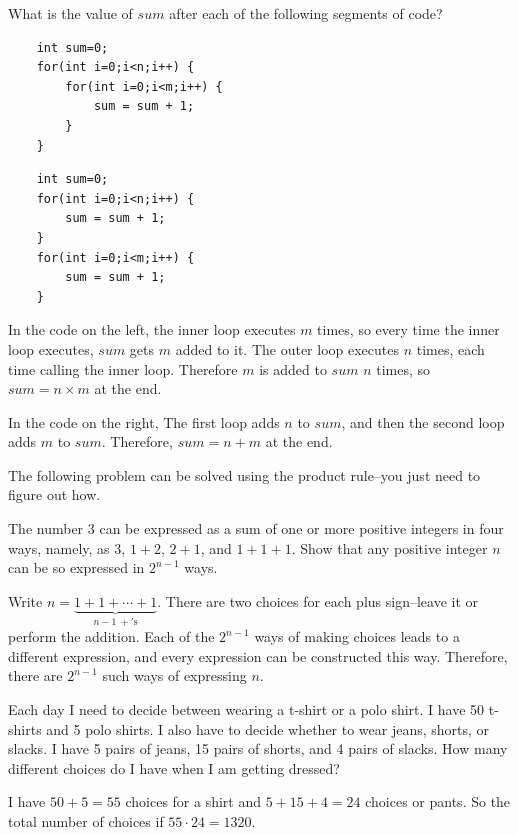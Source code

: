 \begin{exa}
What is the value of $sum$ after each of the following segments of code?

\noindent
\begin{minipage}[t]{.45\textwidth}
{\small 
\begin{verbatim}
    int sum=0;
    for(int i=0;i<n;i++) {
        for(int i=0;i<m;i++) {
            sum = sum + 1;
        }
    }
\end{verbatim}
}
\end{minipage}
\hfill
\begin{minipage}[t]{.45\textwidth}
{\small 
\begin{verbatim}
    int sum=0;
    for(int i=0;i<n;i++) {
        sum = sum + 1;
    }
    for(int i=0;i<m;i++) {
        sum = sum + 1;
    }
\end{verbatim}
}
\end{minipage}
\begin{sol}
In the code on the left, the inner loop executes $m$ times, so every time
the inner loop executes, $sum$ gets $m$ added to it.  The outer loop executes $n$
times, each time calling the inner loop.  Therefore $m$ is added to $sum$ $n$ times,
so $sum=n\times m$ at the end.

In the code on the right,  The first loop adds $n$ to $sum$, and then the second loop
adds $m$ to $sum$.  Therefore, $sum=n+m$ at the end.
\end{sol}
\end{exa}

The following problem can be solved using the product rule--you just need to figure out how.

\begin{exer}
The number $3$ can be expressed as a sum of one or more positive
integers in four ways, namely, as $3$, $1+2$, $2+1$, and $1+1+1$.
Show that any positive integer $n$ can be so expressed in $2^{n-1}$
ways.

\noindent
\answerlinethree
\begin{answer} 
Write $n = \underbrace{1 + 1 + \cdots + 1}_{n-1 \ +\mathrm{'s}}$.
There are two choices for each plus sign--leave it or perform the addition.
Each of the $2^{n-1}$ ways of making choices leads to a different
expression, and every expression can be constructed this way.
Therefore, there are $2^{n-1}$ such ways of expressing $n$.
\end{answer}
\end{exer}

\begin{exa}
Each day I need to decide between wearing a t-shirt or a polo shirt.
I have 50 t-shirts and 5 polo shirts.  I also have to decide whether to 
wear jeans, shorts, or slacks.  I have 5 pairs of jeans, 15 pairs of shorts,
and 4 pairs of slacks.  How many different choices do I have when I am 
getting dressed?
\begin{sol}
I have $50+5=55$ choices for a shirt and $5+15+4=24$ choices or pants.
So the total number of choices if $55\cdot 24=1320$.
\end{sol}
\end{exa}

